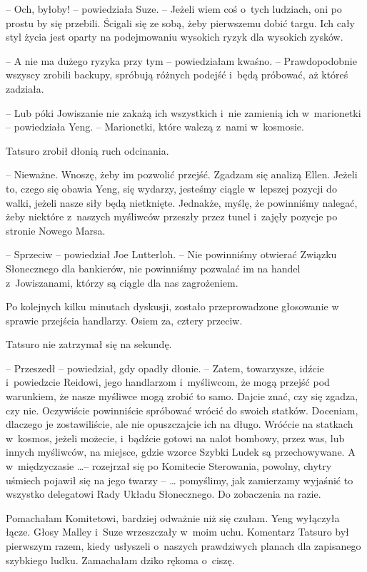 \documentclass[oneside,polish,11pt,sfheadings]{mwbk}
\begin{document}
-- Och, byłoby! -- powiedziała Suze. -- Jeżeli wiem coś o~tych ludziach,
oni po prostu by się przebili. Ścigali się ze sobą, żeby pierwszemu
dobić targu. Ich cały styl życia jest oparty na podejmowaniu wysokich
ryzyk dla wysokich zysków.

-- A nie ma dużego ryzyka przy tym -- powiedziałam kwaśno. -- Prawdopodobnie wszyscy zrobili backupy, spróbują różnych podejść i~będą
próbować, aż któreś zadziała.

-- Lub póki Jowiszanie nie zakażą ich wszystkich i~nie zamienią ich w~marionetki -- powiedziała Yeng. -- Marionetki, które walczą z~nami w~kosmosie.

Tatsuro zrobił dłonią ruch odcinania. 

-- Nieważne. Wnoszę, żeby im
pozwolić przejść. Zgadzam się analizą Ellen. Jeżeli to, czego się obawia
Yeng, się wydarzy, jesteśmy ciągle w~lepszej pozycji do walki, jeżeli
nasze siły będą nietknięte. Jednakże, myślę, że powinniśmy nalegać, żeby
niektóre z~naszych myśliwców przeszły przez tunel i~zajęły pozycje po
stronie Nowego Marsa.

-- Sprzeciw -- powiedział Joe Lutterloh. -- Nie powinniśmy otwierać Związku
Słonecznego dla bankierów, nie powinniśmy pozwalać im na handel z~Jowiszanami, którzy są ciągle dla nas zagrożeniem.

Po kolejnych kilku minutach dyskusji, zostało przeprowadzone głosowanie
w sprawie przejścia handlarzy. Osiem za, cztery przeciw.

Tatsuro nie zatrzymał się na sekundę. 

-- Przeszedł -- powiedział, gdy
opadły dłonie. -- Zatem, towarzysze, idźcie i~powiedzcie Reidowi, jego
handlarzom i~myśliwcom, że mogą przejść pod warunkiem, że nasze myśliwce
mogą zrobić to samo. Dajcie znać, czy się zgadza, czy nie. Oczywiście
powinniście spróbować wrócić do swoich statków. Doceniam, dlaczego je
zostawiliście, ale nie opuszczajcie ich na długo. Wróćcie na statkach w~kosmos, jeżeli możecie, i~bądźcie gotowi na nalot bombowy, przez was,
lub innych myśliwców, na miejsce, gdzie wzorce Szybki Ludek są
przechowywane. A w~międzyczasie \ldots  -- rozejrzał się po Komitecie
Sterowania, powolny, chytry uśmiech pojawił się na jego twarzy -- \ldots 
pomyślimy, jak zamierzamy wyjaśnić to wszystko delegatowi Rady Układu
Słonecznego. Do zobaczenia na razie.

Pomachałam Komitetowi, bardziej odważnie niż się czułam. Yeng wyłączyła
łącze. Głosy Malley i~Suze wrzeszczały w~moim uchu. Komentarz Tatsuro
był pierwszym razem, kiedy usłyszeli o~naszych prawdziwych planach dla
zapisanego szybkiego ludku. Zamachałam dziko rękoma o~ciszę.
\end{document}
